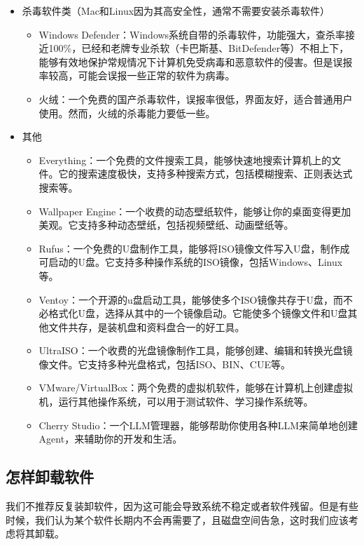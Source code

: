 \documentclass[../main.tex]{subfiles}
\begin{document}
\begin{itemize}
\begin{itemize}
    \end{itemize}
  \item 杀毒软件类（Mac和Linux因为其高安全性，通常不需要安装杀毒软件）
    \begin{itemize}
      \item Windows Defender：Windows系统自带的杀毒软件，功能强大，查杀率接近100\%，已经和老牌专业杀软（卡巴斯基、BitDefender等）不相上下，能够有效地保护常规情况下计算机免受病毒和恶意软件的侵害。但是误报率较高，可能会误报一些正常的软件为病毒。
      \item 火绒：一个免费的国产杀毒软件，误报率很低，界面友好，适合普通用户使用。然而，火绒的杀毒能力要低一些。
    \end{itemize}
  \item 其他
    \begin{itemize}
      \item Everything：一个免费的文件搜索工具，能够快速地搜索计算机上的文件。它的搜索速度极快，支持多种搜索方式，包括模糊搜索、正则表达式搜索等。
      \item Wallpaper Engine：一个收费的动态壁纸软件，能够让你的桌面变得更加美观。它支持多种动态壁纸，包括视频壁纸、动画壁纸等。
      \item Rufus：一个免费的U盘制作工具，能够将ISO镜像文件写入U盘，制作成可启动的U盘。它支持多种操作系统的ISO镜像，包括Windows、Linux等。
      \item Ventoy：一个开源的u盘启动工具，能够使多个ISO镜像共存于U盘，而不必格式化U盘，选择从其中的一个镜像启动。它能使多个镜像文件和U盘其他文件共存，是装机盘和资料盘合一的好工具。
      \item UltraISO：一个收费的光盘镜像制作工具，能够创建、编辑和转换光盘镜像文件。它支持多种光盘格式，包括ISO、BIN、CUE等。
      \item VMware/VirtualBox：两个免费的虚拟机软件，能够在计算机上创建虚拟机，运行其他操作系统，可以用于测试软件、学习操作系统等。
      \item Cherry Studio：一个LLM管理器，能够帮助你使用各种LLM来简单地创建Agent，来辅助你的开发和生活。
    \end{itemize}
\end{itemize}

\subsection{怎样卸载软件}

我们不推荐反复装卸软件，因为这可能会导致系统不稳定或者软件残留。但是有些时候，我们认为某个软件长期内不会再需要了，且磁盘空间告急，这时我们应该考虑将其卸载。
\end{document}
